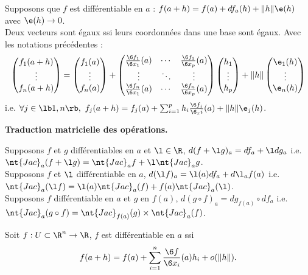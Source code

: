 \documentclass[11pt]{article}
\newcommand*{\Jac}{\nt{Jac}}
\begin{document}
Supposons que $f$ est différentiable en $a$ : $f(a+h) = f(a) + df_a(h) + \|h\|\e(h)$ avec $\e(h)\to0$.\\
Deux vecteurs sont égaux ssi leurs coordonnées dans une base sont égaux. Avec les notations précédentes :
\begin{equation*}
    \begin{pmatrix}
        f_1(a+h) \\ \vdots \\ f_n(a+h)
    \end{pmatrix} = \begin{pmatrix}
        f_1(a) \\ \vdots \\ f_n(a)
    \end{pmatrix} + \begin{pmatrix}
        \frac{\6 f_1}{\6 x_1}(a) & \cdots & \frac{\6 f_1}{\6 x_p}(a) \\ \vdots & \ddots & \vdots \\ \frac{\6 f_n}{\6 x_1}(a) & \cdots & \frac{\6 f_n}{\6 x_p}(a)
    \end{pmatrix} \begin{pmatrix}
        h_1 \\ \vdots \\ h_p
    \end{pmatrix} + \|h\|\begin{pmatrix}
        \e_1(h) \\ \vdots \\ \e_n(h)
    \end{pmatrix}
\end{equation*}
i.e. $\forall j \in \lb1,n\rb, ~ f_j(a+h)=f_j(a) + \sum_{i=1}^p h_i\frac{\6 f_j}{\6_xi}(a) + \|h\|\e_j(h)$.

\bf{Traduction matricielle des opérations.}

Supposons $f$ et $g$ différentiables en $a$ et $\l\in\R$, $d(f+\l g)_a = df_a + \l dg_a$ i.e. $\Jac_a(f+\l g)=\Jac_a f + \l \Jac_a g$.\\
Supposons $f$ et $\l$ différentiable en $a$, $d(\l f)_a = \l(a)df_a+d\l_af(a)$ i.e. $\Jac_a(\l f) = \l(a)\Jac_a(f)+f(a)\Jac_a(\l)$.\\
Supposons $f$ différentiable en $a$ et $g$ en $f(a)$, $d(g\circ f)_a = dg_{f(a)}\circ df_a$ i.e. $\Jac_a(g\circ f)=\Jac_{f(a)}(g)\times \Jac_a(f)$.

\begin{defi}{}{}
    Soit $f:U\subset\R^n\to\R$, $f$ est différentiable en $a$ ssi 
    \begin{equation*}
        f(a+h) = f(a) + \sum_{i=1}^n \frac{\6 f}{\6 x_i}(a)h_i + o(\|h\|).
    \end{equation*}
\end{defi}
\end{document}
